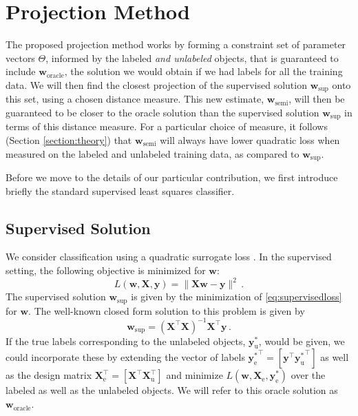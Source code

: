 \documentclass[smallcondensed]{svjour3}\usepackage[]{graphicx}\usepackage[]{color}
\newcommand{\Xe}{\vec{X}_\mathrm{e}  }
\renewcommand{\vec}[1]{\mathbf{#1}}
\begin{document}
\section{Projection Method}
\label{section:projections}
The proposed projection method works by forming a constraint set of parameter vectors $\Theta$, informed by the labeled \emph{and unlabeled} objects, that is guaranteed to include $\vec{w}_\text{oracle}$, the solution we would obtain if we had labels for all the training data. We will then find the closest projection of the supervised solution $\vec{w}_{\text{sup}}$ onto this set, using a chosen distance measure. This new estimate, $\vec{w}_{\text{semi}}$, will then be guaranteed to be closer to the oracle solution than the supervised solution $\vec{w}_{\text{sup}}$ in terms of this distance measure. For a particular choice of measure, it follows (Section \ref{section:theory}) that $\vec{w}_{\text{semi}}$ will always have lower quadratic loss when measured on the labeled and unlabeled training data, as compared to $\vec{w}_{\text{sup}}$.

Before we move to the details of our particular contribution, we first introduce briefly the standard supervised least squares classifier.

\subsection{Supervised Solution}
We consider classification using a quadratic surrogate loss \citep{Hastie2009}. In the supervised setting, the following objective is minimized for $\vec{w}$:
\begin{equation}
\label{eq:supervisedloss}
L(\vec{w},\vec{X},\vec{y}) = \lVert \vec{X} \vec{w} - \vec{y} \rVert^2 \,.
\end{equation}
The supervised solution $\vec{w}_{\text{sup}}$ is given by the minimization of \eqref{eq:supervisedloss} for $\vec{w}$. The well-known closed form solution to this problem is given by
\begin{equation}
\label{eq:supervisedsolution}
\vec{w}_{\text{sup}} = (\vec{X}^\top \vec{X})^{-1} \vec{X}^\top \vec{y} \,.
\end{equation}
If the true labels corresponding to the unlabeled objects, $\vec{y}_\text{u}^{\ast}$, would be given, we could incorporate these by extending the vector of labels ${\vec{y}_\text{e}^\ast}^\top = \left[ \vec{y}^\top {\vec{y}_\text{u}^\ast}^\top \right]$ as well as the design matrix $\vec{X}_\text{e}^\top = \left[ \vec{X}^\top \vec{X}_\text{u}^\top \right]$ and minimize $L(\vec{w},\Xe, \vec{y}_\text{e}^\ast)$ over the labeled as well as the unlabeled objects. We will refer to this oracle solution as $\vec{w}_\text{oracle}$. 
\end{document}
